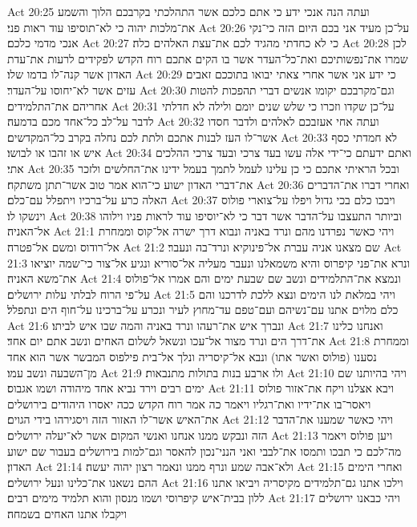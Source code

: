Act 20:25  ועתה הנה אנכי ידע כי אתם כלכם אשר התהלכתי בקרבכם הלוך והשמע את־מלכות יהוה כי לא־תוסיפו עוד ראות פני׃
Act 20:26  על־כן מעיד אני בכם היום הזה כי־נקי אנכי מדמי כלכם׃
Act 20:27  כי לא כחדתי מהגיד לכם את־עצת האלהים כלה׃
Act 20:28  לכן שמרו את־נפשותיכם ואת־כל־העדר אשר בו הקים אתכם רוח הקדש לפקידים לרעות את־עדת האדון אשר קנה־לו בדמו שלו׃
Act 20:29  כי ידע אני אשר אחרי צאתי יבואו בתוככם זאבים עזים אשר לא־יחוסו על־העדר׃
Act 20:30  וגם־מקרבכם יקומו אנשים דברי תהפכות להטות אחריהם את־התלמידים׃
Act 20:31  על־כן שקדו וזכרו כי שלש שנים יומם ולילה לא חדלתי לדבר על־לב כל־אחד מכם בדמעה׃
Act 20:32  ועתה אחי אעזבכם לאלהים ולדבר חסדו אשר־לו העז לבנות אתכם ולתת לכם נחלה בקרב כל־המקדשים׃
Act 20:33  לא חמדתי כסף איש או זהבו או לבושו׃
Act 20:34  ואתם ידעתם כי־ידי אלה עשו בעד צרכי ובעד צרכי ההלכים אתי׃
Act 20:35  ובכל הראיתי אתכם כי כן עלינו לעמל לתמך בעמל ידינו את־החלשים ולזכר את־דברי האדון ישוע כי־הוא אמר טוב אשר־תתן משתקח׃
Act 20:36  ואחרי דברו את־הדברים האלה כרע על־ברכיו ויתפלל עם־כלם׃
Act 20:37  ויבכו כלם בכי גדול ויפלו על־צוארי פולוס וינשקו לו׃
Act 20:38  וביותר התעצבו על־הדבר אשר דבר כי לא־יוסיפו עוד לראות פניו וילוהו אל־האניה׃
Act 21:1  ויהי כאשר נפרדנו מהם ונרד באניה ונבוא דרך ישרה אל־קוס וממחרת אל־רודוס ומשם אל־פטרה׃
Act 21:2  שם מצאנו אניה עברת אל־פינוקיא ונרד־בה ונעבר׃
Act 21:3  ונרא את־פני קיפרוס והיא משמאלנו ונעבר מעליה אל־סוריא ונגיע אל־צור כי־שמה יוציאו את־משא האניה׃
Act 21:4  ונמצא את־התלמידים ונשב שם שבעת ימים והם אמרו אל־פולוס על־פי הרוח לבלתי עלות ירושלים׃
Act 21:5  ויהי במלאת לנו הימים ונצא ללכת לדרכנו והם כלם מלוים אתנו עם־נשיהם ועם־טפם עד־מחוץ לעיר ונכרע על־ברכינו על־חוף הים ונתפלל׃
Act 21:6  ונברך איש את־רעהו ונרד באניה והמה שבו איש לביתו׃
Act 21:7  ואנחנו כלינו את־דרך הים ונרד מצור אל־עכו ונשאל לשלום האחים ונשב אתם יום אחד׃
Act 21:8  וממחרת נסענו (פולוס ואשר אתו) ונבא אל־קיסריה ונלך אל־בית פילפוס המבשר אשר הוא אחד מן־השבעה ונשב עמו׃
Act 21:9  ולו ארבע בנות בתולות מתנבאות׃
Act 21:10  ויהי בהיותנו שם ימים רבים וירד נביא אחד מיהודה ושמו אגבוס׃
Act 21:11  ויבא אצלנו ויקח את־אזור פולוס ויאסר־בו את־ידיו ואת־רגליו ויאמר כה אמר רוח הקדש ככה יאסרו היהודים בירושלים את־האיש אשר־לו האזור הזה ויסגירהו בידי הגוים׃
Act 21:12  ויהי כאשר שמענו את־הדבר הזה ונבקש ממנו אנחנו ואנשי המקום אשר לא־יעלה ירושלים׃
Act 21:13  ויען פולוס ויאמר מה־לכם כי תבכו ותמסו את־לבבי ואני הנני־נכון להאסר וגם־למות בירושלים בעבור שם ישוע האדון׃
Act 21:14  ולא־אבה שמע ונרף ממנו ונאמר רצון יהוה יעשה׃
Act 21:15  ואחרי הימים ההם נשאנו את־כלינו ונעל ירושלים׃
Act 21:16  וילכו אתנו גם־תלמידים מקיסריה ויביאו אתנו ללון בבית־איש קיפרוסי ושמו מנסון והוא תלמיד מימים רבים׃
Act 21:17  ויהי כבאנו ירושלים ויקבלו אתנו האחים בשמחה׃
